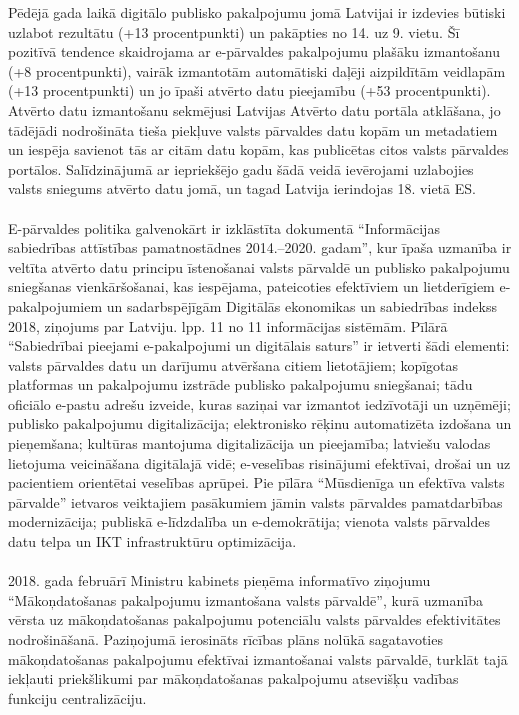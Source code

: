 Pēdējā gada laikā digitālo publisko pakalpojumu jomā Latvijai ir izdevies būtiski uzlabot
rezultātu (+13 procentpunkti) un pakāpties no 14. uz 9. vietu. Šī pozitīvā tendence
skaidrojama ar e-pārvaldes pakalpojumu plašāku izmantošanu (+8 procentpunkti), vairāk
izmantotām automātiski daļēji aizpildītām veidlapām (+13 procentpunkti) un jo īpaši atvērto
datu pieejamību (+53 procentpunkti). Atvērto datu izmantošanu sekmējusi Latvijas Atvērto
datu portāla atklāšana, jo tādējādi nodrošināta tieša piekļuve valsts pārvaldes datu kopām
un metadatiem un iespēja savienot tās ar citām datu kopām, kas publicētas citos valsts
pārvaldes portālos. Salīdzinājumā ar iepriekšējo gadu šādā veidā ievērojami uzlabojies
valsts sniegums atvērto datu jomā, un tagad Latvija ierindojas 18. vietā ES.
\paragraph{}
E-pārvaldes politika galvenokārt ir izklāstīta dokumentā “Informācijas sabiedrības attīstības
pamatnostādnes 2014.–2020. gadam”, kur īpaša uzmanība ir veltīta atvērto datu principu
īstenošanai valsts pārvaldē un publisko pakalpojumu sniegšanas vienkāršošanai, kas
iespējama, pateicoties efektīviem un lietderīgiem e-pakalpojumiem un sadarbspējīgām
Digitālās ekonomikas un sabiedrības indekss 2018, ziņojums par Latviju. lpp. 11 no 11
informācijas sistēmām. Pīlārā “Sabiedrībai pieejami e-pakalpojumi un digitālais saturs” ir
ietverti šādi elementi: valsts pārvaldes datu un darījumu atvēršana citiem lietotājiem;
kopīgotas platformas un pakalpojumu izstrāde publisko pakalpojumu sniegšanai; tādu
oficiālo e-pastu adrešu izveide, kuras saziņai var izmantot iedzīvotāji un uzņēmēji; publisko
pakalpojumu digitalizācija; elektronisko rēķinu automatizēta izdošana un pieņemšana;
kultūras mantojuma digitalizācija un pieejamība; latviešu valodas lietojuma veicināšana
digitālajā vidē; e-veselības risinājumi efektīvai, drošai un uz pacientiem orientētai veselības
aprūpei. Pie pīlāra “Mūsdienīga un efektīva valsts pārvalde” ietvaros veiktajiem pasākumiem
jāmin valsts pārvaldes pamatdarbības modernizācija; publiskā e-līdzdalība un e-demokrātija;
vienota valsts pārvaldes datu telpa un IKT infrastruktūru optimizācija.
\paragraph{}
2018. gada februārī Ministru kabinets pieņēma informatīvo ziņojumu “Mākoņdatošanas
pakalpojumu izmantošana valsts pārvaldē”, kurā uzmanība vērsta uz mākoņdatošanas
pakalpojumu potenciālu valsts pārvaldes efektivitātes nodrošināšanā. Paziņojumā ierosināts
rīcības plāns nolūkā sagatavoties mākoņdatošanas pakalpojumu efektīvai izmantošanai
valsts pārvaldē, turklāt tajā iekļauti priekšlikumi par mākoņdatošanas pakalpojumu atsevišķu
vadības funkciju centralizāciju.

